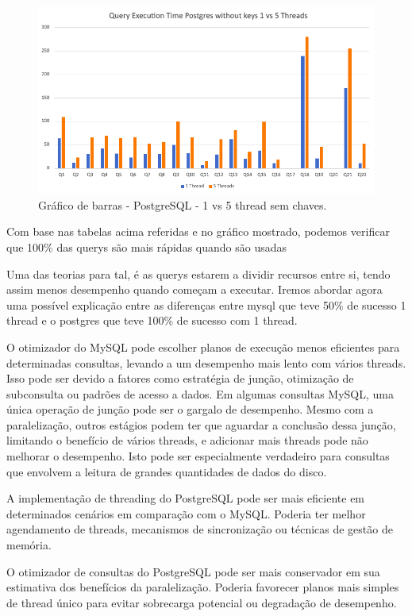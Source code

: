 \documentclass{article}
\begin{document}
  \begin{figure}[H]
    \centering
    \includegraphics[width=\textwidth]{Graphs/postgres_withoutkeys_1vs5.png}
    \caption{Gráfico de barras - PostgreSQL - 1 vs 5 thread sem chaves.} 
    \label{fig:PKCreation2}
  \end{figure}

  Com base nas tabelas acima referidas e no gráfico mostrado, podemos verificar que 100\% das querys são mais rápidas quando são usadas 
  
  Uma das teorias para tal, é as querys estarem a dividir recursos entre si, tendo assim menos desempenho quando começam a executar. Iremos abordar agora uma possível explicação entre as diferenças entre mysql que teve 50\% de sucesso 1 thread e o postgres que teve 100\% de sucesso com 1 thread.

  O otimizador do MySQL pode escolher planos de execução menos eficientes para determinadas consultas, levando a um desempenho mais lento com vários threads. Isso pode ser devido a fatores como estratégia de junção, otimização de subconsulta ou padrões de acesso a dados. Em algumas consultas MySQL, uma única operação de junção pode ser o gargalo de desempenho. Mesmo com a paralelização, outros estágios podem ter que aguardar a conclusão dessa junção, limitando o benefício de vários threads, e adicionar mais threads pode não melhorar o desempenho. Isto pode ser especialmente verdadeiro para consultas que envolvem a leitura de grandes quantidades de dados do disco.

  A implementação de threading do PostgreSQL pode ser mais eficiente em determinados cenários em comparação com o MySQL. Poderia ter melhor agendamento de threads, mecanismos de sincronização ou técnicas de gestão de memória.

  O otimizador de consultas do PostgreSQL pode ser mais conservador em sua estimativa dos benefícios da paralelização. Poderia favorecer planos mais simples de thread único para evitar sobrecarga potencial ou degradação de desempenho.
\end{document}

